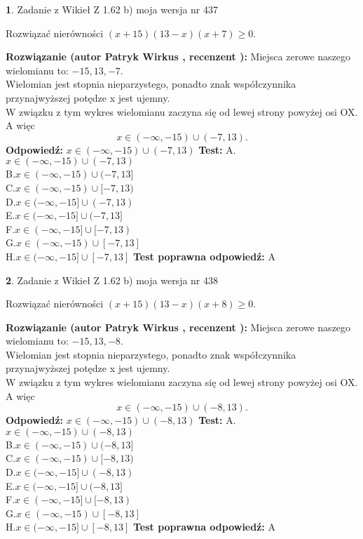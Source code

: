 \documentclass[12pt, a4paper]{article}
\theoremstyle{definition} %
\newtheorem{zad}{}
\newcommand{\zadStart}[1]{\begin{zad}#1\newline}
\newcommand{\zadStop}{\end{zad}}
\newcommand{\rozwStart}[2]{\noindent \textbf{Rozwiązanie (autor #1 , recenzent #2): }\newline}
\newcommand{\rozwStop}{\newline}
\newcommand{\odpStart}{\noindent \textbf{Odpowiedź:}\newline}
\newcommand{\odpStop}{\newline}
\newcommand{\testStart}{\noindent \textbf{Test:}\newline}
\newcommand{\testStop}{\newline}
\newcommand{\kluczStart}{\noindent \textbf{Test poprawna odpowiedź:}\newline}
\newcommand{\kluczStop}{\newline}
\begin{document}
\zadStart{Zadanie z Wikieł Z 1.62 b) moja wersja nr 437}

Rozwiązać nierówności $(x+15)(13-x)(x+7)\ge0$.
\zadStop
\rozwStart{Patryk Wirkus}{}
Miejsca zerowe naszego wielomianu to: $-15, 13, -7$.\\
Wielomian jest stopnia nieparzystego, ponadto znak współczynnika przy\linebreak najwyższej potędze x jest ujemny.\\ W związku z tym wykres wielomianu zaczyna się od lewej strony powyżej osi OX. A więc $$x \in (-\infty,-15) \cup (-7,13).$$
\rozwStop
\odpStart
$x \in (-\infty,-15) \cup (-7,13)$
\odpStop
\testStart
A.$x \in (-\infty,-15) \cup (-7,13)$\\
B.$x \in (-\infty,-15) \cup (-7,13]$\\
C.$x \in (-\infty,-15) \cup [-7,13)$\\
D.$x \in (-\infty,-15] \cup (-7,13)$\\
E.$x \in (-\infty,-15] \cup (-7,13]$\\
F.$x \in (-\infty,-15] \cup [-7,13)$\\
G.$x \in (-\infty,-15) \cup [-7,13]$\\
H.$x \in (-\infty,-15] \cup [-7,13]$
\testStop
\kluczStart
A
\kluczStop



\zadStart{Zadanie z Wikieł Z 1.62 b) moja wersja nr 438}

Rozwiązać nierówności $(x+15)(13-x)(x+8)\ge0$.
\zadStop
\rozwStart{Patryk Wirkus}{}
Miejsca zerowe naszego wielomianu to: $-15, 13, -8$.\\
Wielomian jest stopnia nieparzystego, ponadto znak współczynnika przy\linebreak najwyższej potędze x jest ujemny.\\ W związku z tym wykres wielomianu zaczyna się od lewej strony powyżej osi OX. A więc $$x \in (-\infty,-15) \cup (-8,13).$$
\rozwStop
\odpStart
$x \in (-\infty,-15) \cup (-8,13)$
\odpStop
\testStart
A.$x \in (-\infty,-15) \cup (-8,13)$\\
B.$x \in (-\infty,-15) \cup (-8,13]$\\
C.$x \in (-\infty,-15) \cup [-8,13)$\\
D.$x \in (-\infty,-15] \cup (-8,13)$\\
E.$x \in (-\infty,-15] \cup (-8,13]$\\
F.$x \in (-\infty,-15] \cup [-8,13)$\\
G.$x \in (-\infty,-15) \cup [-8,13]$\\
H.$x \in (-\infty,-15] \cup [-8,13]$
\testStop
\kluczStart
A
\kluczStop
\end{document}
